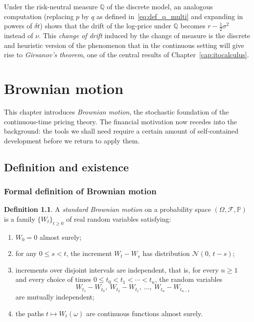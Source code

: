 \documentclass[11pt,a4paper,oneside]{report}
\theoremstyle{plain}
\theoremstyle{definition}
\newtheorem{definicion}[teorema]{Definition}
\theoremstyle{remark}
\newcommand{\PP}{\mathbb{P}}
\newcommand{\Q}{\mathbb{Q}}
\newcommand{\F}{\mathcal{F}}
\newcommand{\1}{\mathbf{1}}
\begin{document}
Under the risk-neutral measure $\Q$ of the discrete model, an
analogous computation (replacing $p$ by $q$ as defined
in~\eqref{eq:def_q_multi} and expanding in powers of $\delta t$) shows
that the drift of the log-price under $\Q$ becomes
$r - \tfrac{1}{2}\sigma^2$ instead of $\nu$. This \emph{change of
drift} induced by the change of measure is the discrete and heuristic
version of the phenomenon that in the continuous setting will give
rise to \emph{Girsanov's theorem}, one of the central results of
Chapter~\ref{cap:itocalculus}.

\chapter{Brownian motion}\label{cap:brown}

This chapter introduces \emph{Brownian motion}, the stochastic
foundation of the continuous-time pricing theory. The financial
motivation now recedes into the background: the tools we shall need
require a certain amount of self-contained development before we
return to apply them.

\section{Definition and existence}
\label{sec:browniano_definicion}

\subsection{Formal definition of Brownian motion}
\label{subsec:browniano_def}

\begin{definicion}
\label{def:browniano}
A \emph{standard Brownian motion} on a probability space
$(\Omega, \F, \PP)$ is a family $\{W_t\}_{t \geq 0}$ of real random
variables satisfying:
\begin{enumerate}[label=\textnormal{(\roman*)}]
  \item $W_0 = 0$ almost surely;
  \item for any $0 \leq s < t$, the increment $W_t - W_s$ has
        distribution $\mathcal{N}(0,\, t - s)$;
  \item increments over disjoint intervals are independent, that is,
        for every $n \geq 1$ and every choice of times
        $0 \leq t_0 < t_1 < \cdots < t_n$, the random variables
        \begin{equation*}
          W_{t_1} - W_{t_0},\ W_{t_2} - W_{t_1},\ \ldots,\
          W_{t_n} - W_{t_{n-1}}
        \end{equation*}
        are mutually independent;
  \item the paths $t \mapsto W_t(\omega)$ are continuous functions
        almost surely.
\end{enumerate}
\end{definicion}
\end{document}
